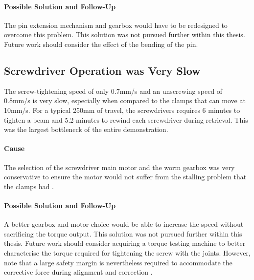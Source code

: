 \paragraph{Possible Solution and Follow-Up}
The pin extension mechanism and gearbox would have to be redesigned to overcome this problem. This solution was not pursued further within this thesis. Future work should consider the effect of the bending of the pin.

\FloatBarrier

\subsection{Screwdriver Operation was Very Slow}
\label{subsection:exploration-4-screwdriver-operation-was-very-slow}

The screw-tightening speed of only 0.7mm/s and an unscrewing speed of 0.8mm/s is very slow, especially when compared to the clamps that can move at 10mm/s.
For a typical 250mm of travel, the screwdrivers requires 6 minutes to tighten a beam and 5.2 minutes to rewind each screwdriver during retrieval. This was the largest bottleneck of the entire demonstration.

\paragraph{Cause}
The selection of the screwdriver main motor and the worm gearbox was very conservative to ensure the motor would not suffer from the stalling problem that the clamps had . 

\paragraph{Possible Solution and Follow-Up}
A better gearbox and motor choice would be able to increase the speed without sacrificing the torque output. This solution was not pursued further within this thesis. Future work should consider acquiring a torque testing machine to better characterise the torque required for tightening the screw with the joints. However, note that a large safety margin is nevertheless required to accommodate the corrective force during alignment and correction .
